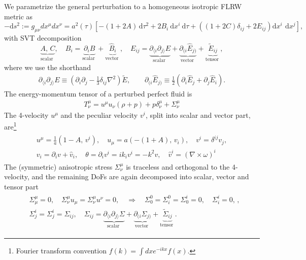 We parametrize the general perturbation to a homogeneous isotropic FLRW metric as
{\small\begin{equation} \label{eq:metric_general_form_svt}
-\mathrm{d} s^{2}:=g_{\mu\nu}dx^\mu dx^\nu=a^{2}(\tau)\left[-(1+2 A) \,\mathrm{d} \tau^{2}+2 B_{i} \mathrm{~d} x^{i} \mathrm{~d} \tau+\left((1+2C)\delta_{ij}+2E_{ij}\right) \mathrm{d} x^{i} \,\mathrm{~d} x^{j}\right],
\end{equation}}
with SVT decomposition
{\small\begin{equation*}
\underbrace{A,\, C}_{\text {scalar }}, \quad
B_{i}=\underbrace{\partial_{i} {B}}_{\text {scalar }}+\underbrace{\hat{B}_{i}}_{\text {vector }},\quad E_{i j}=\underbrace{\partial_{\langle i} \partial_{j\rangle} {E}}_{\text {scalar }}+\underbrace{\partial_{(i} \hat{E}_{j)}}_{\text {vector }}+\underbrace{\tilde{E}_{i j}}_{\text {tensor }},
\end{equation*}}
where we use the shorthand
{\small\begin{align}\label{eq:convention_svt_decomposition}
\partial_{\langle i} \partial_{j\rangle} {E} \equiv\left(\partial_{i} \partial_{j}-\frac{1}{3} \delta_{i j} \nabla^{2}\right) \tilde{E},\qquad
\partial_{(i} \hat{E}_{j)}\equiv \frac{1}{2}\left(\partial_{i} \hat{E}_{j}+\partial_{j} \hat{E}_{i}\right).
\end{align}}
%
The energy-momentum tensor of a perturbed perfect fluid is
\begin{align}\label{eq:em_tensor_fluid_perturbed}
    T^\mu_\nu= u^\mu u_\nu (\rho+p) + p \delta^\mu_\nu + \Sigma^\mu_\nu
\end{align}
The 4-velocity $u^\mu$ and the peculiar velocity $v^i$, split into scalar and vector part, are\footnote{Fourier transform convention $f(k)=\int dx e^{-ikx}f(x)$.}
{\small\begin{align}\label{eq:velocity_decomposition}
\begin{aligned}
    u^\mu=\frac{1}{a}\left(1-A,\,v^i\right),\quad u_\mu=a\left(-(1+A),\,v_i\right),\quad v^i=\delta^{ij}v_j,\\[2pt]
    v_i=\partial_i v + \hat{v}_i, \quad \theta= \partial_i v^i = ik_i v^i = -k^2 v, \quad \hat{v}^i=(\nabla\times \omega)^i
\end{aligned}\end{align}}
The (symmetric) anisotropic stress $\Sigma^\mu_\nu$ is traceless and orthogonal to the 4-velocity, and the remaining DoFs are again decomposed into scalar, vector and tensor part
{\small\begin{align}\label{eq:anisotropic_stress_decomposition}
\begin{aligned}
    &\Sigma^\mu_\mu=0,\quad \Sigma^\mu_\nu u_\mu=\Sigma^\mu_\nu u^\nu=0, \quad \Rightarrow\quad \Sigma^0_0=\Sigma^0_i=\Sigma^i_0=0, \quad \Sigma^i_i=0, \,,\\[3pt]
    &\Sigma^i_j=\Sigma^i_j =\Sigma_{ij},\quad
    \Sigma_{i j}=\underbrace{\partial_{\langle i} \partial_{j\rangle} \Sigma}_{\text {scalar }}+\underbrace{\partial_{(i} \hat{\Sigma}_{j)}}_{\text {vector }}+\underbrace{\tilde{\Sigma}_{i j}}_{\text {tensor }}.
\end{aligned}
\end{align}}
